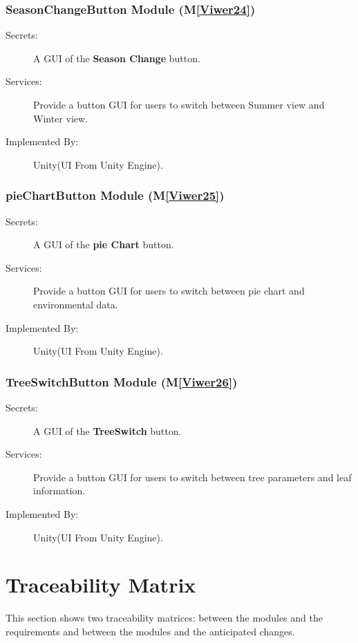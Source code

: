 \documentclass[12pt, titlepage]{article}
\newcommand{\mref}[1]{M\ref{#1}}
\newcommand{\UUI}{Unity(UI From Unity Engine).}
\begin{document}
\subsubsection{SeasonChangeButton Module (\mref{Viwer24})}
\begin{description}
\item[Secrets:] A GUI of the \textbf{Season Change} button.
\item[Services:] Provide a button GUI for users to switch between Summer view and Winter view.
\item[Implemented By:] \UUI
\end{description}

\subsubsection{pieChartButton Module (\mref{Viwer25})}
\begin{description}
\item[Secrets:] A GUI of the \textbf{pie Chart} button.
\item[Services:] Provide a button GUI for users to switch between pie chart and environmental data.
\item[Implemented By:] \UUI
\end{description}

\subsubsection{TreeSwitchButton Module (\mref{Viwer26})}
\begin{description}
\item[Secrets:] A GUI of the \textbf{TreeSwitch} button.
\item[Services:] Provide a button GUI for users to switch between tree parameters and leaf information. 
\item[Implemented By:] \UUI
\end{description}


\newpage

\section{Traceability Matrix} \label{SecTM}

This section shows two traceability matrices: between the modules and the
requirements and between the modules and the anticipated changes.
\end{document}
